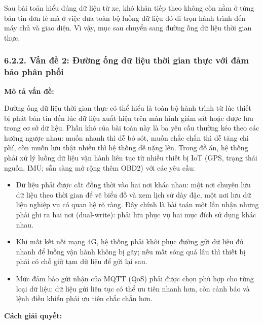\documentclass[a4paper]{extarticle}
\providecommand{\tightlist}{%
  \setlength{\itemsep}{0pt}\setlength{\parskip}{0pt}}
\begin{document}
Sau bài toán hiểu đúng dữ liệu từ xe, khó khăn tiếp theo không còn nằm ở
từng bản tin đơn lẻ mà ở việc đưa toàn bộ luồng dữ liệu đó đi trọn hành
trình đến máy chủ và giao diện. Vì vậy, mục sau chuyển sang đường ống dữ
liệu thời gian thực.

\subsubsection{6.2.2. Vấn đề 2: Đường ống dữ liệu thời gian thực với đảm
bảo phân
phối}\label{622-vux1ea5n-ux111ux1ec1-2-ux111ux1b0ux1eddng-ux1ed1ng-dux1eef-liux1ec7u-thux1eddi-gian-thux1ef1c-vux1edbi-ux111ux1ea3m-bux1ea3o-phuxe2n-phux1ed1i}

\textbf{Mô tả vấn đề:}

Đường ống dữ liệu thời gian thực có thể hiểu là toàn bộ hành trình từ
lúc thiết bị phát bản tin đến lúc dữ liệu xuất hiện trên màn hình giám
sát hoặc được lưu trong cơ sở dữ liệu. Phần khó của bài toán này là ba yêu cầu
thường kéo theo các hướng ngược nhau: muốn nhanh thì dễ bỏ sót, muốn
chắc chắn thì dễ tăng chi phí, còn muốn lưu thật nhiều thì hệ thống dễ
nặng lên. Trong đồ án, hệ thống phải xử lý luồng dữ liệu vận hành liên
tục từ nhiều thiết bị IoT (GPS, trạng thái nguồn, IMU; sẵn sàng mở rộng
thêm OBD2) với các yêu cầu:

\begin{itemize}
\tightlist
\item
  Dữ liệu phải được cất đồng thời vào hai nơi khác nhau: một nơi chuyên
  lưu dữ liệu theo thời gian để vẽ biểu đồ và xem lịch sử dày đặc, một
  nơi lưu dữ liệu nghiệp vụ có quan hệ rõ ràng. Đây chính là bài toán
  một lần nhận nhưng phải ghi ra hai nơi (dual-write):
  phải lưu phục vụ hai mục đích sử dụng khác nhau.
\item
  Khi mất kết nối mạng 4G, hệ thống phải khôi phục đường gửi dữ liệu đủ
  nhanh để luồng vận hành không bị gãy; nếu mất sóng quá lâu thì thiết
  bị phải có chỗ giữ tạm dữ liệu để gửi lại sau.
\item
  Mức đảm bảo gửi nhận của MQTT (QoS) phải được chọn phù hợp cho từng
  loại dữ liệu: dữ liệu gửi liên tục có thể ưu tiên nhanh hơn, còn cảnh
  báo và lệnh điều khiển phải ưu tiên chắc chắn hơn.
\end{itemize}

\textbf{Cách giải quyết:}
\end{document}
